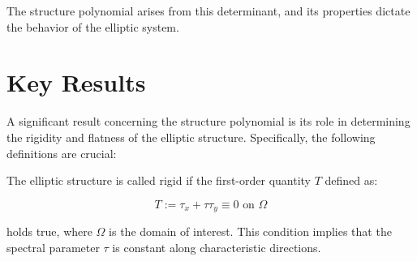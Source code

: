 \documentclass[11pt,a4paper]{article}
\begin{document}
The structure polynomial arises from this determinant, and its properties dictate the behavior of the elliptic system.

\section{Key Results}
A significant result concerning the structure polynomial is its role in determining the rigidity and flatness of the elliptic structure. Specifically, the following definitions are crucial:

\begin{definition}
The elliptic structure is called rigid if the first-order quantity $T$ defined as:

\begin{equation}
T := \tau_x + \tau \tau_y \equiv 0 \text{ on } \Omega
\end{equation}

holds true, where $\Omega$ is the domain of interest. This condition implies that the spectral parameter $\tau$ is constant along characteristic directions.

\end{definition}
\end{document}
